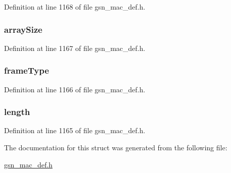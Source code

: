 Definition at line 1168 of file gsn\_\-mac\_\-def.h.

\hypertarget{a00109_a1e9a3e946dd0de39c656edc309a5c36c}{
\subsubsection[{arraySize}]{ {\bf arraySize}}}
\label{a00109_a1e9a3e946dd0de39c656edc309a5c36c}


Definition at line 1167 of file gsn\_\-mac\_\-def.h.

\hypertarget{a00109_a8d99a6146a73b946a6879b071c326978}{
\subsubsection[{frameType}]{ {\bf frameType}}}
\label{a00109_a8d99a6146a73b946a6879b071c326978}


Definition at line 1166 of file gsn\_\-mac\_\-def.h.

\hypertarget{a00109_ae360fb41f422c7c83b87d9af070cbd31}{
\subsubsection[{length}]{ {\bf length}}}
\label{a00109_ae360fb41f422c7c83b87d9af070cbd31}


Definition at line 1165 of file gsn\_\-mac\_\-def.h.



The documentation for this struct was generated from the following file:\begin{DoxyCompactItemize}
\item 
\hyperlink{a00522}{gsn\_\-mac\_\-def.h}\end{DoxyCompactItemize}
